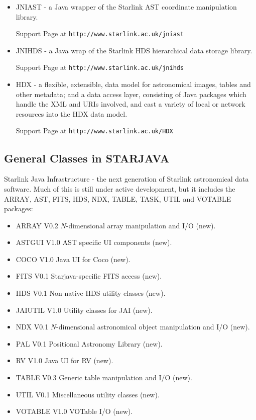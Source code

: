 \documentclass[twoside,11pt]{article}
\newcommand{\htmladdnormallink}[2]{#1}
\newcommand{\latex}[1]{#1}
\newcommand{\xlabel}[1]{}
\renewcommand{\_}{\texttt{\symbol{95}}}
\begin{document}
\begin{itemize}

\item JNIAST - a Java wrapper of the Starlink AST coordinate manipulation library.

Support Page at 
\htmladdnormallink{\texttt{http://www.starlink.ac.uk/jniast}}{http://www.starlink.ac.uk/jniast}

\item JNIHDS - a Java wrap of the Starlink HDS hierarchical data storage library.

Support Page at 
\htmladdnormallink{\texttt{http://www.starlink.ac.uk/jnihds}}{http://www.starlink.ac.uk/jnihds}

\item HDX - a flexible, extensible, data model for astronomical images, tables and 
      other metadata; and a data access layer, consisting of Java packages 
      which handle the XML and URIs involved, and cast a variety of local 
      or network resources into the HDX data model.

Support Page at 
\htmladdnormallink{\texttt{http://www.starlink.ac.uk/HDX}}{http://www.starlink.ac.uk/HDX}

\end{itemize}

\subsection{\label{general}\xlabel{general}General Classes in STARJAVA}

Starlink Java Infrastructure - the next generation of Starlink 
astronomical data software. Much of this is still under active development, 
but it includes the ARRAY, AST, FITS, HDS, NDX, TABLE, TASK, UTIL and VOTABLE 
packages:

\begin{itemize}
\item ARRAY V0.2 $N$-dimensional array manipulation and I/O (new).
\item ASTGUI V1.0 AST specific UI components (new).
\item COCO V1.0 Java UI for Coco (new).
\item FITS V0.1 Starjava-specific FITS access (new).
\item HDS V0.1 Non-native HDS utility classes (new).
\item JAIUTIL V1.0 Utility classes for JAI (new).
\item NDX V0.1 $N$-dimensional astronomical object manipulation and I/O (new).
\item PAL V0.1 Positional Astronomy Library (new).
\item RV V1.0 Java UI for RV (new).
\item TABLE V0.3 Generic table manipulation and I/O (new).
\item UTIL V0.1 Miscellaneous utility classes (new).
\item VOTABLE V1.0 VOTable I/O (new).
\end{itemize}
\end{document}
